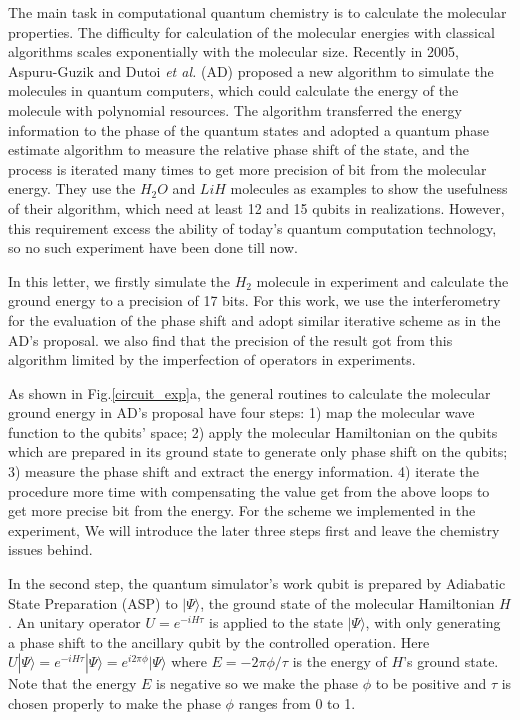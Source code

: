 \def\CTeXPreproc{Created by ctex v0.2.12, don't edit!}\documentclass[twocolumn,showpacs,twoside,10pt,superscriptaddress,prl]{revtex4}
\begin{document}
The main task in computational quantum chemistry is to calculate the
molecular properties. The difficulty for calculation of the
molecular energies with classical algorithms scales exponentially
with the molecular size\cite{molenergy}. Recently in 2005,
Aspuru-Guzik and Dutoi \emph{et al.} (AD)\cite{molenergy} proposed a
new algorithm to simulate the molecules in quantum computers, which
could calculate the energy of the molecule with polynomial
resources. The algorithm transferred the energy information to the
phase of the quantum states and adopted a quantum phase estimate
algorithm to measure the relative phase shift of the state, and the
process is iterated many times to get more precision of bit from the
molecular energy. They use the $H_2O$ and $LiH$ molecules as
examples to show the usefulness of their algorithm, which need at
least 12 and 15 qubits in realizations. However, this requirement
excess the ability of today's quantum computation technology, so no
such experiment have been done till now.

In this letter, we firstly simulate the $H_2$ molecule in experiment
and calculate the ground energy to a precision of 17 bits. For this
work, we use the interferometry for the evaluation of the phase
shift and adopt similar iterative scheme as in the AD's proposal. we
also find that the precision of the result got from this algorithm
limited by the imperfection of operators in experiments.



As shown in Fig.\ref{circuit_exp}a, the general routines to
calculate the molecular ground energy in AD's proposal have four
steps: 1) map the molecular wave function to the qubits' space; 2)
apply the molecular Hamiltonian on the qubits which are prepared in
its ground state to generate only phase shift on the qubits; 3)
measure the phase shift and extract the energy information. 4)
iterate the procedure more time with compensating the value get from
the above loops to get more precise bit from the energy. For the
scheme we implemented in the experiment, We will introduce the later
three steps first and leave the chemistry issues behind.

In the second step, the quantum simulator's work qubit is prepared
by Adiabatic State Preparation (ASP) to $|\Psi\rangle$, the ground
state of the molecular Hamiltonian $H$. An unitary operator
$U=e^{-iH\tau}$ is applied to the state $|\Psi\rangle$, with only
generating a phase shift to the ancillary qubit by the controlled
operation. Here
$U|\Psi\rangle=e^{-iH\tau}|\Psi\rangle=e^{i2\pi\phi}|\Psi\rangle$
where $E=-2\pi\phi/\tau$ is the energy of $H$'s ground state. Note
that the energy $E$ is negative so we make the phase $\phi$ to be
positive and $\tau$ is chosen properly to make the phase $\phi$
ranges from 0 to 1.
\end{document}

